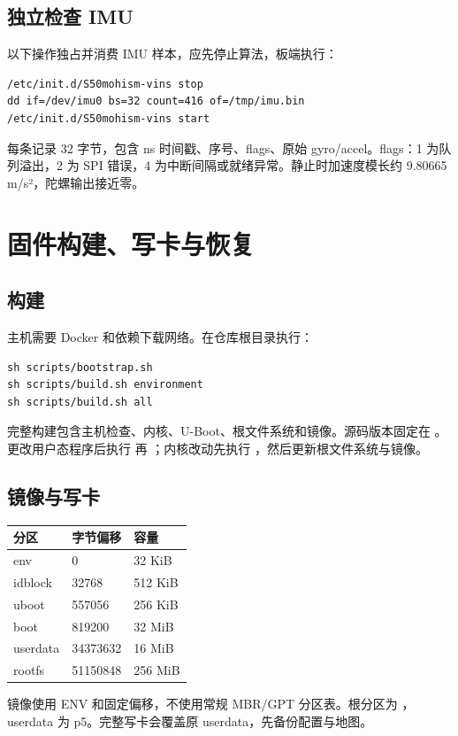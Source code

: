 \subsection{独立检查 IMU}
以下操作独占并消费 IMU 样本，应先停止算法，板端执行：
\begin{lstlisting}
/etc/init.d/S50mohism-vins stop
dd if=/dev/imu0 bs=32 count=416 of=/tmp/imu.bin
/etc/init.d/S50mohism-vins start
\end{lstlisting}
每条记录 32 字节，包含 ns 时间戳、序号、flags、原始 gyro/accel。flags：1 为队列溢出，2 为 SPI 错误，4 为中断间隔或就绪异常。静止时加速度模长约 9.80665 m/s²，陀螺输出接近零。
\newpage
\section{固件构建、写卡与恢复}
\subsection{构建}
主机需要 Docker 和依赖下载网络。在仓库根目录执行：
\begin{lstlisting}
sh scripts/bootstrap.sh
sh scripts/build.sh environment
sh scripts/build.sh all
\end{lstlisting}
完整构建包含主机检查、内核、U-Boot、根文件系统和镜像。源码版本固定在 。更改用户态程序后执行  再 ；内核改动先执行 ，然后更新根文件系统与镜像。

\subsection{镜像与写卡}
\par\noindent\begin{tabularx}{\linewidth}{@{}p{24mm}p{34mm}Y@{}}\toprule
分区 & 字节偏移 & 容量\\\midrule
env & 0 & 32 KiB\\
idblock & 32768 & 512 KiB\\
uboot & 557056 & 256 KiB\\
boot & 819200 & 32 MiB\\
userdata & 34373632 & 16 MiB\\
rootfs & 51150848 & 256 MiB\\\bottomrule
\end{tabularx}\par
镜像使用 ENV 和固定偏移，不使用常规 MBR/GPT 分区表。根分区为 ，userdata 为 p5。完整写卡会覆盖原 userdata，先备份配置与地图。

